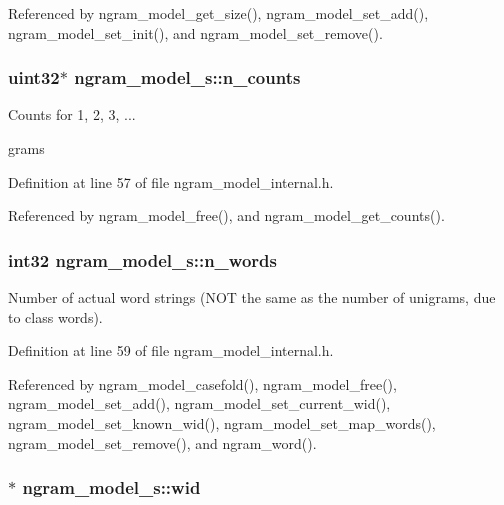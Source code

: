 Referenced by ngram\+\_\+model\+\_\+get\+\_\+size(), ngram\+\_\+model\+\_\+set\+\_\+add(), ngram\+\_\+model\+\_\+set\+\_\+init(), and ngram\+\_\+model\+\_\+set\+\_\+remove().

\subsubsection[{n\+\_\+counts}]{\setlength{\rightskip}{0pt plus 5cm}uint32$\ast$ ngram\+\_\+model\+\_\+s\+::n\+\_\+counts}\label{structngram__model__s_a710daed84ee676f79dcbf510fca238e8}


Counts for 1, 2, 3, ... 

grams 

Definition at line 57 of file ngram\+\_\+model\+\_\+internal.\+h.



Referenced by ngram\+\_\+model\+\_\+free(), and ngram\+\_\+model\+\_\+get\+\_\+counts().

\subsubsection[{n\+\_\+words}]{\setlength{\rightskip}{0pt plus 5cm}int32 ngram\+\_\+model\+\_\+s\+::n\+\_\+words}\label{structngram__model__s_a74f85927ef0d5513a1e6c02d13864be3}


Number of actual word strings (N\+O\+T the same as the number of unigrams, due to class words). 



Definition at line 59 of file ngram\+\_\+model\+\_\+internal.\+h.



Referenced by ngram\+\_\+model\+\_\+casefold(), ngram\+\_\+model\+\_\+free(), ngram\+\_\+model\+\_\+set\+\_\+add(), ngram\+\_\+model\+\_\+set\+\_\+current\+\_\+wid(), ngram\+\_\+model\+\_\+set\+\_\+known\+\_\+wid(), ngram\+\_\+model\+\_\+set\+\_\+map\+\_\+words(), ngram\+\_\+model\+\_\+set\+\_\+remove(), and ngram\+\_\+word().

\subsubsection[{wid}]{$\ast$ ngram\+\_\+model\+\_\+s\+::wid}\label{structngram__model__s_a75567419a8002ef6e916c81f5d9ee9ed}


